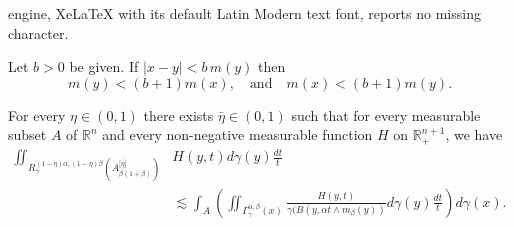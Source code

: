 \documentclass[10pt,a4paper]{amsart}
\begin{document}
engine, XeLaTeX with its default Latin Modern text font, reports no missing character.
  \begin{lemma}\label{comparacion}
Let $b>0$ be given. If $|x-y|<b\, m(y)$ then 
$$m(y)<(b+1)m(x), \quad  \text{and} \quad m(x)<(b+1)m(y).$$
\end{lemma}

\begin{lemma}\label{lema: desigualdad integral, relacion entre eta y beta}
For every $\eta\in (0,1)$ there exists $\bar{\eta}\in (0,1)$ such that for every measurable subset $A$ of $\mathbb R^n$ and every non-negative measurable function $H$ on $\mathbb R^{n+1}_+$, we have
\begin{align*}
    \iint_{R^{(1-\eta)\alpha, (1-\eta)\beta}_\gamma\left(A_{\beta(1+\beta)}^{[\bar{\eta]}}\right)} & H(y,t) d\gamma(y) \frac{dt}{t} \\
    &\lesssim \int_A \left(\iint_{\Gamma_\gamma^{\alpha, \beta}(x)} \frac{H(y,t)}{\gamma(B(y,\alpha t\wedge m_\beta(y))} d\gamma(y) \frac{dt}{t}\right) d\gamma(x).
\end{align*}
\end{lemma}
\end{document}
